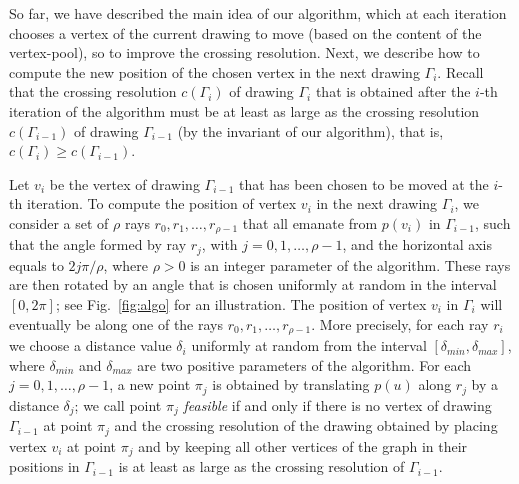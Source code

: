 \documentclass{comjnl}
\begin{document}
So far, we have described the main idea of our algorithm, which at each iteration chooses  a vertex of the current drawing to move (based on the content of the vertex-pool), so to improve the crossing resolution. Next, we describe how to compute the new position of the chosen vertex in the next drawing $\Gamma_i$. Recall that the crossing resolution $c(\Gamma_{i})$ of drawing $\Gamma_{i}$ that is obtained after the $i$-th iteration of the algorithm must be at least as large as the crossing resolution $c(\Gamma_{i-1})$ of drawing $\Gamma_{i-1}$ (by the invariant of our algorithm), that is, $c(\Gamma_i) \ge c(\Gamma_{i-1})$. 

Let $v_i$ be the vertex of drawing $\Gamma_{i-1}$ that has been chosen to be moved at the $i$-th iteration. To compute the position of vertex $v_i$ in the next drawing $\Gamma_i$, we consider a set of $\rho$ rays $r_0,r_1,\ldots,r_{\rho-1}$ that all emanate from $p(v_i)$ in $\Gamma_{i-1}$, such that the angle formed by ray $r_j$, with $j=0,1,\ldots,\rho-1$, and the horizontal axis equals to $2j\pi/\rho$, where $\rho>0$ is an integer parameter of the algorithm. These rays are then rotated by an angle that is chosen uniformly at random in the interval $[0,2\pi]$; see Fig.~\ref{fig:algo} for an illustration. The position of vertex $v_i$ in $\Gamma_i$ will eventually be along one of the rays $r_0,r_1,\ldots,r_{\rho-1}$. More precisely, for each ray $r_i$ we choose a distance value $\delta_i$ uniformly at random from the interval $[\delta_{min},\delta_{max}]$, where $\delta_{min}$ and $\delta_{max}$ are two positive parameters of the algorithm. For each $j=0,1,\ldots,\rho-1$, a new point $\pi_j$ is obtained by translating $p(u)$ along $r_j$ by a distance $\delta_j$; we call point $\pi_j$ \emph{feasible} if and only if there is no vertex of drawing $\Gamma_{i-1}$ at point $\pi_j$ and the crossing resolution of the drawing obtained by placing vertex $v_i$ at point $\pi_j$ and by keeping all other vertices of the graph in their positions in $\Gamma_{i-1}$ is at least as large as the crossing resolution of $\Gamma_{i-1}$.
\end{document}
